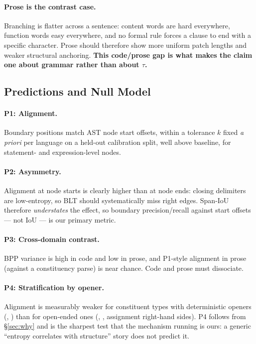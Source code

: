 \paragraph{Prose is the contrast case.}
Branching is flatter across a sentence: content words are hard everywhere, function words
easy everywhere, and no formal rule forces a clause to end with a specific character. Prose
should therefore show more uniform patch lengths and weaker structural anchoring.
\textbf{This code/prose gap is what makes the claim one about grammar rather than about
$\tau$.}

\subsection{Predictions and Null Model}
\label{sec:pred}

\paragraph{P1: Alignment.} Boundary positions match AST node start offsets, within a
tolerance $k$ fixed \emph{a priori} per language on a held-out calibration split, well
above baseline, for statement- and expression-level nodes.

\paragraph{P2: Asymmetry.} Alignment at node starts is clearly higher than at node ends:
closing delimiters are low-entropy, so BLT should systematically miss right edges. Span-IoU
therefore \emph{understates} the effect, so boundary precision/recall against start offsets
--- not IoU --- is our primary metric.

\paragraph{P3: Cross-domain contrast.} BPP variance is high in code and low in prose, and
P1-style alignment in prose (against a constituency parse) is near chance. Code and prose
must dissociate.

\paragraph{P4: Stratification by opener.} Alignment is measurably weaker for constituent
types with deterministic openers (, ) than for
open-ended ones (, , assignment
right-hand sides). P4 follows from \S\ref{sec:why} and is the sharpest test that the
mechanism running is ours: a generic ``entropy correlates with structure'' story does not
predict it.

